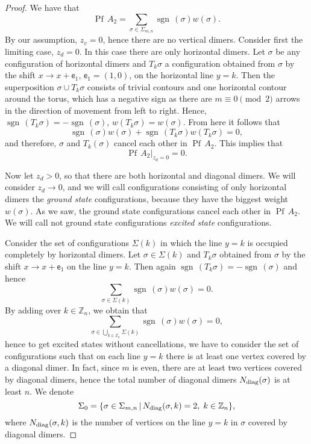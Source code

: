 \documentclass[12pt,reqno]{amsart}
\numberwithin{equation}{section}
\newcommand{\Z}{{\mathbb Z}}
\newcommand{\sg}{\sigma}
\newcommand{\Pf}{{\operatorname{Pf}\,}}
\newcommand{\sgn}{{\operatorname{sgn}\,}}
\begin{document}
\begin{proof} We have that 
\begin{equation}\label{pos2}
\Pf A_2=\sum_{\sg\in\Sigma_{m,n}} \sgn(\sg) w(\sg).
\end{equation} 
By our assumption, $z_v=0$, hence there are no vertical dimers.
Consider first the limiting case,  $z_d=0$. In this case there are only horizontal dimers.
Let $\sg$ be any configuration of horizontal dimers and $T_k\sg$ a configuration obtained from $\sg$ by the shift $x\to x+\mathsf e_1$,
$\mathsf e_1=(1,0)$, on the horizontal line $y=k$. Then the superposition
$\sg\cup T_k\sg$ consists of trivial contours and one horizontal contour around the torus, which has a negative sign as there are $m\equiv 0 \pmod 2$ arrows in the direction of movement from left to right. Hence,
$\sgn(T_k\sg)=-\sgn(\sg)$, $w(T_k\sg)=w(\sg)$. From here it follows that
\[
\sgn(\sg) w(\sg)+\sgn(T_k\sg)w(T_k\sg)=0,
\]
and therefore, $\sg$ and $T_k(\sg)$ cancel each other in $\Pf A_2$. This implies that
\begin{equation}\label{pos2.1}
\Pf A_2\big|_{z_d=0}=0.
\end{equation} 

Now let $z_d>0$, so that there are both horizontal and diagonal dimers. We will consider $z_d\to 0$,
and we will call configurations consisting of only horizontal dimers the {\it ground state}
configurations, because they have the biggest weight $w(\sg)$. As we saw, the ground state configurations
cancel each other in $\Pf A_2$. We will call not ground state configurations  {\it excited state} configurations.

Consider the set of configurations $\Sigma(k)$
in which the line $y=k$ is occupied completely by horizontal dimers. Let $\sg\in \Sigma(k)$ and $T_k\sg$ obtained
from $\sg$ by the shift  $x\to x+\mathsf e_1$ on the  line $y=k$. Then  
again $\sgn(T_k\sg)=-\sgn(\sg)$ and hence
\[
\sum_{\sg\in\Sigma(k)} \sgn(\sg) w(\sg)=0.
\]
By adding over $k\in\Z_n$, we obtain that
\begin{equation}\label{pos3}
\sum_{\sg\in\bigcup_{k\in\Z_n}\Sigma(k)} \sgn(\sg) w(\sg)=0,
\end{equation}
hence to get excited states without cancellations, we have to consider the set of configurations  such that
on each line $y=k$ there is at least one vertex covered by a diagonal dimer. In fact, since $m$ is even, there are  
at least two vertices covered by diagonal dimers, 
hence the total number of diagonal dimers $ N_{\rm diag}(\sg)$
is at least $n$.
We denote 
\begin{equation}\label{Sg0}
\Sigma_0=\{\sg\in\Sigma_{m,n}\,|\,N_{\rm diag}(\sg,k)=2,\;k\in\Z_n\},
\end{equation}
where $N_{\rm diag}(\sg,k)$ is the number of vertices on the line $y=k$ in $\sg$ covered by diagonal dimers. 



\end{proof}
\end{document}
